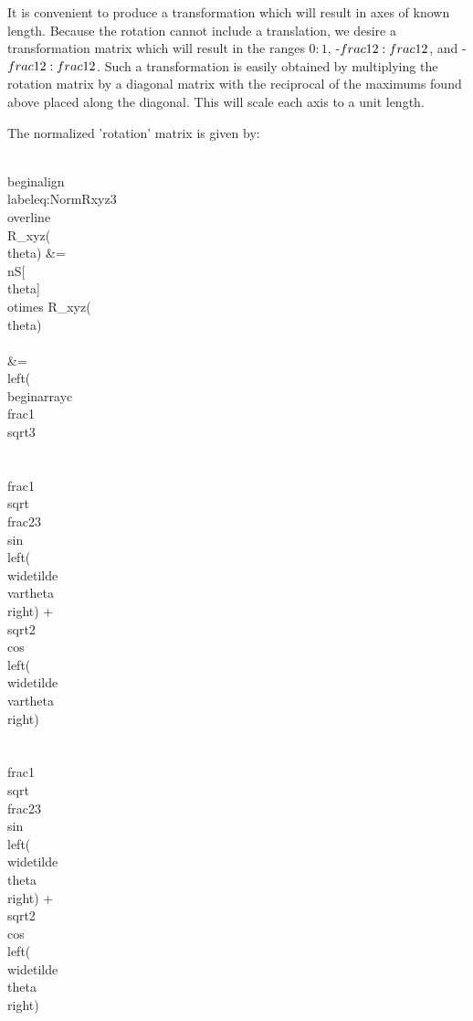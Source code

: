 It is convenient to produce a transformation which will result in axes of known length. Because the rotation cannot include a translation, we desire a transformation matrix which will result in the ranges $0:1$, -$\\frac{1}2:\\frac{1}2$, and -$\\frac{1}2:\\frac{1}2$. Such a transformation is easily obtained by multiplying the rotation matrix by a diagonal matrix with the reciprocal of the maximums found above placed along the diagonal. This will scale each axis to a unit length.

The normalized 'rotation' matrix is given by:


\\begin{align}\\label{eq:NormRxyz3}
 \\overline{\\R}_{xyz}(\\theta) &= \\nS[\\theta] \\otimes R_{xyz}(\\theta) \\\\
&=\\left(
\\begin{array}{c}
 \\frac{1}{\\sqrt{3}}  \\\\
 \\frac{1}{\\sqrt{\\frac{2}{3}} \\sin \\left(\\widetilde{\\vartheta}\\right) + \\sqrt{2} \\cos \\left(\\widetilde{\\vartheta}\\right)} \\\\
 \\frac{1}{\\sqrt{\\frac{2}{3}} \\sin \\left(\\widetilde{\\theta}\\right) + \\sqrt{2} \\cos \\left(\\widetilde{\\theta}\\right)  }  \\\\
